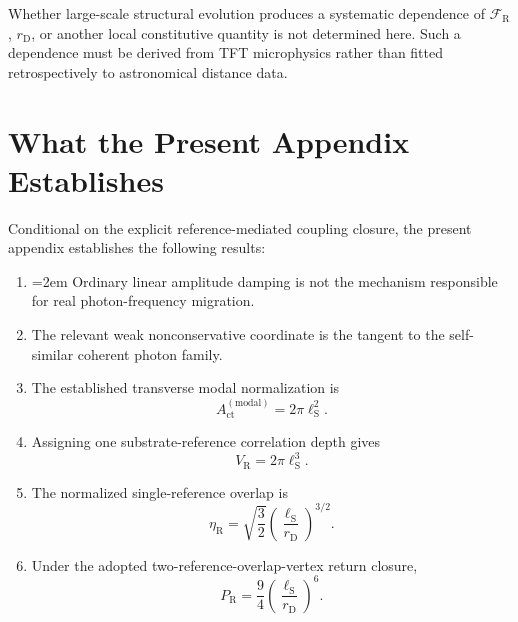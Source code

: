 Whether large-scale structural evolution produces a systematic dependence of
$\mathcal F_{\mathrm R}$, $r_{\mathrm D}$, or another local constitutive
quantity is not determined here. Such a dependence must be derived from TFT
microphysics rather than fitted retrospectively to astronomical distance data.


\section{What the Present Appendix Establishes}

Conditional on the explicit reference-mediated coupling closure, the present
appendix establishes the following results:

\begin{enumerate}
    \item {\emergencystretch=2em
    Ordinary linear amplitude damping is not the mechanism responsible
    for real photon-frequency migration.\par}

    \item The relevant weak nonconservative coordinate is the tangent to the
    self-similar coherent photon family.

    \item The established transverse modal normalization is
    \begin{equation}
        A_{\mathrm{ct}}^{(\mathrm{modal})}
        =
        2\pi\ell_{\mathrm S}^{2}.
    \end{equation}

    \item Assigning one substrate-reference correlation depth gives
    \begin{equation}
        V_{\mathrm R}
        =
        2\pi\ell_{\mathrm S}^{3}.
    \end{equation}

    \item The normalized single-reference overlap is
    \begin{equation}
        \eta_{\mathrm R}
        =
        \sqrt{\frac32}
        \left(
            \frac{\ell_{\mathrm S}}{r_{\mathrm D}}
        \right)^{3/2}.
    \end{equation}

    \item Under the adopted two-reference-overlap-vertex return closure,
    \begin{equation}
        P_{\mathrm R}
        =
        \frac94
        \left(
            \frac{\ell_{\mathrm S}}{r_{\mathrm D}}
        \right)^6.
    \end{equation}


\end{enumerate}
